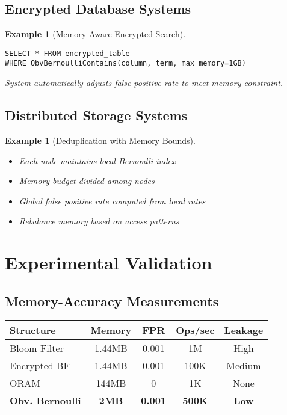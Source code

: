 \documentclass[11pt,final]{article}
\newtheorem{example}[theorem]{Example}
\begin{document}
\subsection{Encrypted Database Systems}

\begin{example}[Memory-Aware Encrypted Search]
\begin{verbatim}
SELECT * FROM encrypted_table 
WHERE ObvBernoulliContains(column, term, max_memory=1GB)
\end{verbatim}
System automatically adjusts false positive rate to meet memory constraint.
\end{example}

\subsection{Distributed Storage Systems}

\begin{example}[Deduplication with Memory Bounds]
\begin{itemize}
    \item Each node maintains local Bernoulli index
    \item Memory budget divided among nodes
    \item Global false positive rate computed from local rates
    \item Rebalance memory based on access patterns
\end{itemize}
\end{example}

\section{Experimental Validation}

\subsection{Memory-Accuracy Measurements}

\begin{center}
\begin{tabular}{lcccc}
\toprule
\textbf{Structure} & \textbf{Memory} & \textbf{FPR} & \textbf{Ops/sec} & \textbf{Leakage} \\
\midrule
Bloom Filter & 1.44MB & 0.001 & 1M & High \\
Encrypted BF & 1.44MB & 0.001 & 100K & Medium \\
ORAM & 144MB & 0 & 1K & None \\
\textbf{Obv. Bernoulli} & \textbf{2MB} & \textbf{0.001} & \textbf{500K} & \textbf{Low} \\
\bottomrule
\end{tabular}
\end{center}
\end{document}

